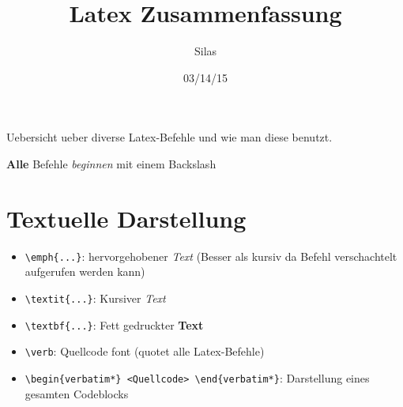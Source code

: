 \documentclass[11pt]{article}
\title{Latex Zusammenfassung}
\author{Silas}
\date{03/14/15}
\begin{document}
\maketitle
Uebersicht ueber diverse Latex-Befehle und wie man diese benutzt.

\textbf{Alle} Befehle \emph{beginnen} mit einem Backslash

\section{Textuelle Darstellung}
\begin{itemize}
  \item \verb|\emph{...}|: hervorgehobener \emph{Text} (Besser als kursiv da Befehl verschachtelt aufgerufen werden kann)
  \item \verb|\textit{...}|: Kursiver \textit{Text}
  \item \verb|\textbf{...}|: Fett gedruckter \textbf{Text}
  \item \verb|\verb|: Quellcode font (quotet alle Latex-Befehle)
  \item \verb|\begin{verbatim*} <Quellcode> \end{verbatim*}|: Darstellung eines gesamten Codeblocks
\end{itemize}
\end{document}
